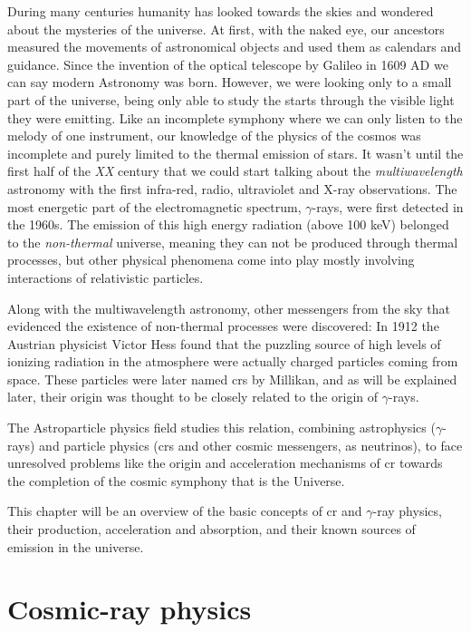 \documentclass[main.tex]{subfiles}
\begin{document}
During many centuries humanity has looked towards the skies and wondered about the mysteries of the universe. At first, with the naked eye, our ancestors measured the movements of astronomical objects and used them as calendars and guidance. Since the invention of the optical telescope by Galileo in 1609 AD we can say modern Astronomy was born. However, we were looking only to a small part of the universe, being only able to study the starts through the visible light they were emitting. Like an incomplete symphony where we can only listen to the melody of one instrument, our knowledge of the physics of the cosmos was incomplete and purely limited to the thermal emission of stars. It wasn't until the first half of the \textit{XX} century that we could start talking about the \textit{multiwavelength} astronomy with the first infra-red, radio, ultraviolet and X-ray observations. The most energetic part of the electromagnetic spectrum, $\gamma$-rays, were first detected in the 1960s. The emission of this high energy radiation (above 100 keV) belonged to the \textit{non-thermal} universe, meaning they can not be produced through thermal processes, but other physical phenomena come into play mostly involving interactions of relativistic particles. 

Along with the multiwavelength astronomy, other messengers from the sky that evidenced the existence of non-thermal processes were discovered: In 1912 the Austrian physicist Victor Hess found that the puzzling source of high levels of ionizing radiation in the atmosphere were actually charged particles coming from space. These particles were later named \glspl{cr} by Millikan, and as will be explained later, their origin was thought to be closely related to the origin of $\gamma$-rays.

The Astroparticle physics field studies this relation, combining astrophysics ($\gamma$-rays) and particle physics (\glspl{cr} and other cosmic messengers, as neutrinos), to face unresolved problems like the origin and acceleration mechanisms of \gls{cr} towards the completion of the cosmic symphony that is the Universe.

This chapter will be an overview of the basic concepts of \gls{cr} and $\gamma$-ray physics, their production, acceleration and absorption, and their known sources of emission in the universe.

\section{Cosmic-ray physics}
\end{document}
